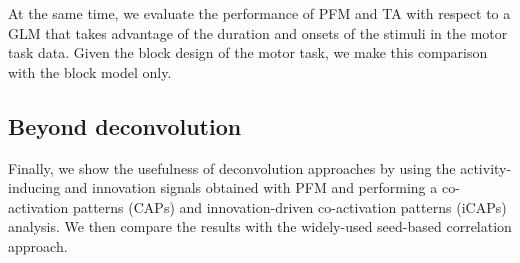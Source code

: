 At the same time, we evaluate the performance of PFM and TA with respect to a GLM that takes advantage of the duration and onsets of the stimuli in the motor task data. Given the block design of the motor task, we make this comparison with the block model only.

\subsection{Beyond deconvolution}
Finally, we show the usefulness of deconvolution approaches by using the activity-inducing and innovation signals obtained with PFM and performing a co-activation patterns (CAPs) and innovation-driven co-activation patterns (iCAPs) analysis. We then compare the results with the widely-used seed-based correlation approach.